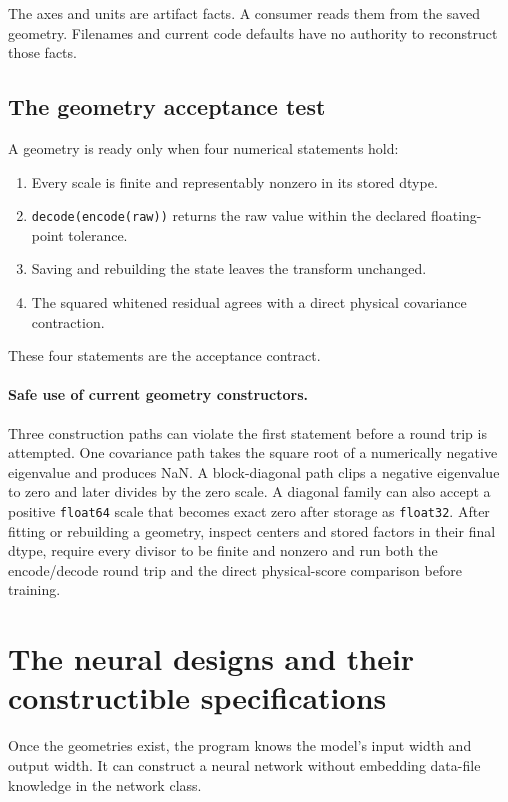 \documentclass[10pt,aps,prd,twocolumn,nofootinbib]{revtex4-2}
\newcommand{\code}[1]{\texttt{#1}}
\begin{document}
The axes and units are artifact facts.  A consumer reads them from the saved
geometry.  Filenames and current code defaults have no authority to
reconstruct those facts.

\subsection{The geometry acceptance test}

A geometry is ready only when four numerical statements hold:
\begin{enumerate}
  \item Every scale is finite and representably nonzero in its stored dtype.
  \item \code{decode(encode(raw))} returns the raw value within the declared
        floating-point tolerance.
  \item Saving and rebuilding the state leaves the transform unchanged.
  \item The squared whitened residual agrees with a direct physical
        covariance contraction.
\end{enumerate}

These four statements are the acceptance contract.

\paragraph{Safe use of current geometry constructors.}
Three construction paths can violate the first statement before a round trip
is attempted.  One covariance path takes the square root of a numerically
negative eigenvalue and produces NaN.  A block-diagonal path clips a negative
eigenvalue to zero and later divides by the zero scale.  A diagonal family can
also accept a positive \code{float64} scale that becomes exact zero after
storage as \code{float32}.  After fitting or rebuilding a geometry, inspect
centers and stored factors in their final dtype, require every divisor to be
finite and nonzero and run both the encode/decode round trip and the direct
physical-score comparison before training.

\section{The neural designs and their constructible specifications}
\label{chap:models}

Once the geometries exist, the program knows the model's input width and
output width.  It can construct a neural network without embedding data-file
knowledge in the network class.
\end{document}
